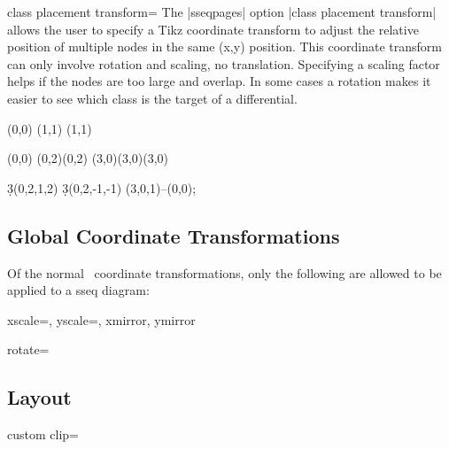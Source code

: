 \documentclass{ltxdoc}
\begin{document}
\begin{sseqdata}[name=ex1,degree={#1}{1-#1}]
\begin{key}{class placement transform=}
The |sseqpages| option |class placement transform| allows the user to specify a Tikz coordinate transform to adjust the relative position of multiple nodes in the same (x,y) position. This coordinate transform can only involve rotation and scaling, no translation. Specifying a scaling factor helps if the nodes are too large and overlap. In some cases a rotation makes it easier to see which class is the target of a differential.
\begin{codeexample}[width=5cm]
\begin{sseqpage}[classes={draw=none},class placement transform={xscale=3},
                 xscale=2, x axis extend end=0.7cm]
\class["$\mathbb{Z}$"](0,0)
\class["$\mathbb{Z}/2$"](1,1)
\class["$\mathbb{Z}/3$"](1,1)
\end{sseqpage}
\end{codeexample}
\begin{codeexample}[width=5cm]
\begin{sseqpage}[classes=fill,class placement transform={rotate=40},
                 cohomological Serre grading,differentials=blue,scale=0.7]
\class(0,0)
\class(0,2)\class(0,2)
\class[red](3,0)\class[green](3,0)\class[blue](3,0)

\d3(0,2,1,2)
\d3(0,2,-1,-1)
\draw[->,red](3,0,1)--(0,0);
\end{sseqpage}
\end{codeexample}
\end{key}



\subsection{Global Coordinate Transformations}
Of the normal \tikzname\ coordinate transformations, only the following are allowed to be applied to a sseq diagram:
\begin{keylist}{xscale=, yscale=, xmirror, ymirror}

\end{keylist}

\begin{key}{rotate=}

\end{key}

\subsection{Layout}
\begin{key}{custom clip=}


\end{key}
\end{sseqdata}
\end{document}
